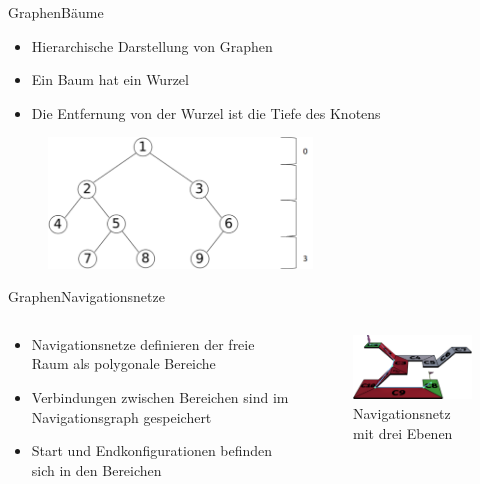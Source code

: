 \documentclass[t,aspectratio=169,dvipsnames]{beamer}
\begin{document}
\begin{frame}{Graphen}{Bäume}
	\begin{itemize}
		\item Hierarchische Darstellung von Graphen
		\item Ein Baum hat ein Wurzel
		\item Die Entfernung von der Wurzel ist die Tiefe des Knotens
	\end{itemize}
	
	\begin{figure}
		\includegraphics[width=7.0cm]{images/Bild5.png}
	\end{figure}
\end{frame}
\begin{frame}{Graphen}{Navigationsnetze}
	\begin{columns}
		\begin{column}[T]{0.5\textwidth}
			\begin{itemize}
				\item Navigationsnetze definieren der freie Raum als polygonale Bereiche
				\item Verbindungen zwischen Bereichen sind im Navigationsgraph gespeichert
				\item Start und Endkonfigurationen befinden sich in den Bereichen
			\end{itemize}
		\end{column}
		\begin{column}[T]{0.5\textwidth}
			\begin{figure}
				\includegraphics[width=6.5cm]{images/mesh_with_path.png}
				\caption{Navigationsnetz mit drei Ebenen} 
			\end{figure}
		\end{column}
	\end{columns}
\end{frame}
\end{document}
